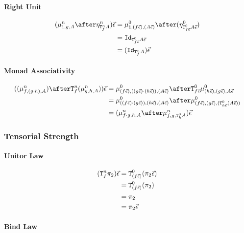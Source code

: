\documentclass{report}
\begin{document}
\paragraph{Right Unit}

\begin{align}
    (\bindn{\1}{g}{A}\after\pointn{\Tn{f}{A}})\ev &= \bindz{\1}{(f\ev)}{(A\ev)} \after (\pointz{\Tz{f\ev}{A\ev}})\\
    &= \Id{\Tz{f\ev}{A\ev}}\\
    &=(\Id{\Tn{f}{A}})\ev
\end{align}


\paragraph{Monad Associativity}

\begin{align}
    ((\bindn{f}{(g\dot h)}{A})\after\Tn{f}{(\bindn{g}{h}{A})})\ev &= \bindz{(f\ev)}{((g\ev)\dot(h\ev))}{(A\ev)}\after\Tz{f\ev}{\bindz{(h\ev)}{(g\ev)}{A\ev}}\\
    &= \bindz{((f\ev)\dot(g\ev))}{(h\ev)}{(A\ev)}\after\bindz{(f\ev)}{(g\ev)}{(\Tz{h\ev}{(A\ev)})}\\
    & = (\bindn{f\dot g}{h}{A}\after\bindn{f}{g}{\Tz{h}{A}})\ev
\end{align}
\subsubsection{Tensorial Strength}

\paragraph{Unitor Law}
\begin{align}
    (\texttt{T}^n_{f}\pi_2)\vec{\epsilon}&= \texttt{T}^0_{(f\vec{\epsilon})}(\pi_2\vec{\epsilon})\\
    & =  \texttt{T}^0_{(f\vec{\epsilon})}(\pi_2)\\
    & = \pi_2\\
    &= \pi_2\vec{\epsilon}
\end{align}

\paragraph{Bind Law}

\end{document}
